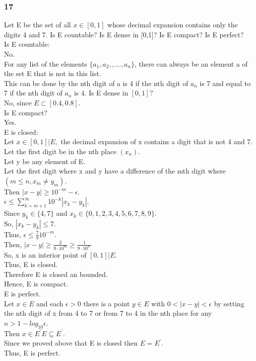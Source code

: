 \subsubsection*{17}
Let E be the set of all $x \in [0,1]$ whose decimal expansion contains only the digits 4 and 7. Is E countable? Is E dense in [0,1]? Is E compact? Is E perfect? \\ 
Is E countable: \\ 
No. \\ 
For any list of the elements $\{a_1,a_2,,...,a_n\}$, there can always be an element a of the set E that is not in this list. \\ 
This can be done by the nth digit of a is 4 if the nth digit of $a_n$ is 7 and equal to 7 if the nth digit of $a_n$ is 4.  Is E dense in $[0,1]?$\\ 
No, since $E \subset[0.4,0.8].$\\ 
Is E compact? \\ 
Yes. \\ 
E is closed:\\ 
Let $x \in [0,1]|E,$ the decimal expansion of x contains a digit that is not 4 and 7. \\ 
Let the first digit be in the nth place $(x_n).$\\ 
Let y be any element of E. \\ 
Let the first digit where x and y have a difference of the mth digit where $(m \leq n,x_m \neq y_m).$\\ 
Then $|x-y|\geq 10^{-m}- \epsilon.$\\ 
$\epsilon \leq \sum_{k=m+1}^\infty 10^{-k}|x_k-y_k|.$\\ 
Since $y_k \in \{4,7\}$ and $x_k \in \{0,1,2,3,4,5,6,7,8,9\}.$\\ 
So, $|x_k-y_k|\leq 7.$\\ 
Thus, $\epsilon \leq \frac{7}{9}10^{-m}.$\\ 
Then, $|x-y|\geq \frac{2}{9 \cdot 10^m}\geq \frac{1}{9 \cdot 10^n.}$\\ 
So, x is an interior point of $[0,1]|E.$\\ 
Thus, E is closed. \\ 
Therefore E is closed an bounded. \\ 
Hence, E is compact. \\ 
E is perfect. \\ 
Let $x \in E$ and each $ \epsilon >0$ there is a point $y \in E$ with $0<|x-y|<\epsilon$ by setting the nth digit of x from 4 to 7 or from 7 to 4 in the nth place for any $n>1-log_{10} \epsilon.$\\ 
Then $x \in E^{'} E \subseteq E^{'}.$\\ Since we proved above that E is closed then $E=E^{'}.$ \\ 
Thus, E is perfect. 
